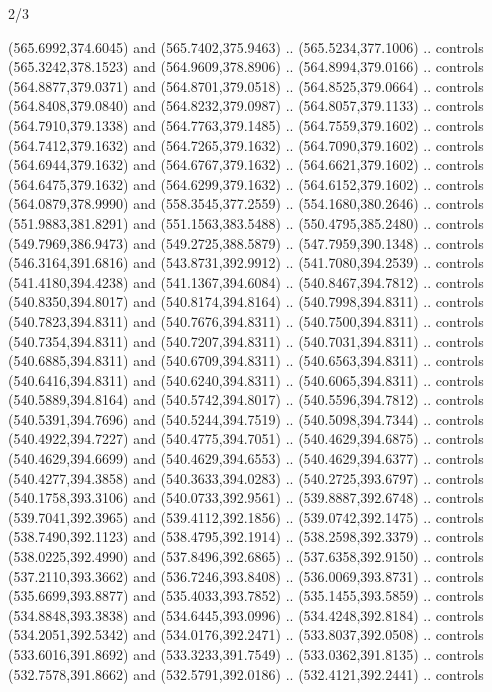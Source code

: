 \begin{flagdescription}{2/3}
\begin{scope}[xshift=0.5\flaglength,yshift=0.5\flagwidth,scale=\flagwidth/495.65]
\begin{scope}[y=0.8pt, x=0.8pt, yscale=-1,shift={(-463.76,-309.78)}]
  (565.6992,374.6045) and (565.7402,375.9463) .. (565.5234,377.1006) .. controls
  (565.3242,378.1523) and (564.9609,378.8906) .. (564.8994,379.0166) .. controls
  (564.8877,379.0371) and (564.8701,379.0518) .. (564.8525,379.0664) .. controls
  (564.8408,379.0840) and (564.8232,379.0987) .. (564.8057,379.1133) .. controls
  (564.7910,379.1338) and (564.7763,379.1485) .. (564.7559,379.1602) .. controls
  (564.7412,379.1632) and (564.7265,379.1632) .. (564.7090,379.1602) .. controls
  (564.6944,379.1632) and (564.6767,379.1632) .. (564.6621,379.1602) .. controls
  (564.6475,379.1632) and (564.6299,379.1632) .. (564.6152,379.1602) .. controls
  (564.0879,378.9990) and (558.3545,377.2559) .. (554.1680,380.2646) .. controls
  (551.9883,381.8291) and (551.1563,383.5488) .. (550.4795,385.2480) .. controls
  (549.7969,386.9473) and (549.2725,388.5879) .. (547.7959,390.1348) .. controls
  (546.3164,391.6816) and (543.8731,392.9912) .. (541.7080,394.2539) .. controls
  (541.4180,394.4238) and (541.1367,394.6084) .. (540.8467,394.7812) .. controls
  (540.8350,394.8017) and (540.8174,394.8164) .. (540.7998,394.8311) .. controls
  (540.7823,394.8311) and (540.7676,394.8311) .. (540.7500,394.8311) .. controls
  (540.7354,394.8311) and (540.7207,394.8311) .. (540.7031,394.8311) .. controls
  (540.6885,394.8311) and (540.6709,394.8311) .. (540.6563,394.8311) .. controls
  (540.6416,394.8311) and (540.6240,394.8311) .. (540.6065,394.8311) .. controls
  (540.5889,394.8164) and (540.5742,394.8017) .. (540.5596,394.7812) .. controls
  (540.5391,394.7696) and (540.5244,394.7519) .. (540.5098,394.7344) .. controls
  (540.4922,394.7227) and (540.4775,394.7051) .. (540.4629,394.6875) .. controls
  (540.4629,394.6699) and (540.4629,394.6553) .. (540.4629,394.6377) .. controls
  (540.4277,394.3858) and (540.3633,394.0283) .. (540.2725,393.6797) .. controls
  (540.1758,393.3106) and (540.0733,392.9561) .. (539.8887,392.6748) .. controls
  (539.7041,392.3965) and (539.4112,392.1856) .. (539.0742,392.1475) .. controls
  (538.7490,392.1123) and (538.4795,392.1914) .. (538.2598,392.3379) .. controls
  (538.0225,392.4990) and (537.8496,392.6865) .. (537.6358,392.9150) .. controls
  (537.2110,393.3662) and (536.7246,393.8408) .. (536.0069,393.8731) .. controls
  (535.6699,393.8877) and (535.4033,393.7852) .. (535.1455,393.5859) .. controls
  (534.8848,393.3838) and (534.6445,393.0996) .. (534.4248,392.8184) .. controls
  (534.2051,392.5342) and (534.0176,392.2471) .. (533.8037,392.0508) .. controls
  (533.6016,391.8692) and (533.3233,391.7549) .. (533.0362,391.8135) .. controls
  (532.7578,391.8662) and (532.5791,392.0186) .. (532.4121,392.2441) .. controls

\end{scope}
\end{scope}
\end{flagdescription}
